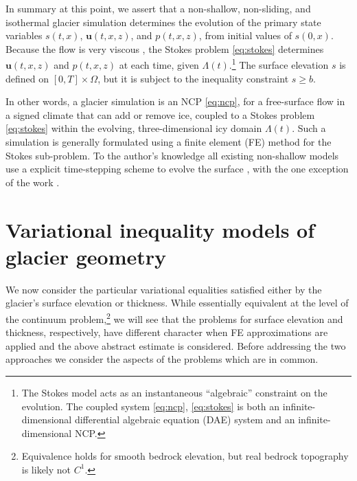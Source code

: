 \documentclass[hidelinks,onefignum,onetabnum,final]{siamart220329}  %
\newcommand{\bu}{\mathbf{u}}
\begin{document}
In summary at this point, we assert that a non-shallow, non-sliding, and isothermal glacier simulation determines the evolution of the primary state variables $s(t,x)$, $\bu(t,x,z)$, and $p(t,x,z)$, from initial values of $s(0,x)$.  Because the flow is very viscous \cite{Acheson1990}, the Stokes problem \eqref{eq:stokes} determines $\bu(t,x,z)$ and $p(t,x,z)$ at each time, given $\Lambda(t)$.\footnote{The Stokes model acts as an instantaneous ``algebraic'' constraint on the evolution.  The coupled system \eqref{eq:ncp}, \eqref{eq:stokes} is both an infinite-dimensional differential algebraic equation (DAE) system and an infinite-dimensional NCP.}  The surface elevation $s$ is defined on $[0,T]\times \Omega$, but it is subject to the inequality constraint $s\ge b$.

In other words, a glacier simulation is an NCP \eqref{eq:ncp}, for a free-surface flow in a signed climate that can add or remove ice, coupled to a Stokes problem \eqref{eq:stokes} within the evolving, three-dimensional icy domain $\Lambda(t)$.  Such a simulation is generally formulated using a finite element (FE) method for the Stokes sub-problem.  To the author's knowledge all existing non-shallow models use a explicit time-stepping scheme to evolve the surface \cite[for example]{Jouvetetal2008}, with the one exception of the work \cite{WirbelJarosch2020}.  


\section{Variational inequality models of glacier geometry} \label{sec:models}

We now consider the particular variational equalities satisfied either by the glacier's surface elevation or thickness.  While essentially equivalent at the level of the continuum problem,\footnote{Equivalence holds for smooth bedrock elevation, but real bedrock topography is likely not $C^1$.} we will see that the problems for surface elevation and thickness, respectively, have different character when FE approximations are applied and the above abstract estimate is considered.  Before addressing the two approaches we consider the aspects of the problems which are in common.
\end{document}
